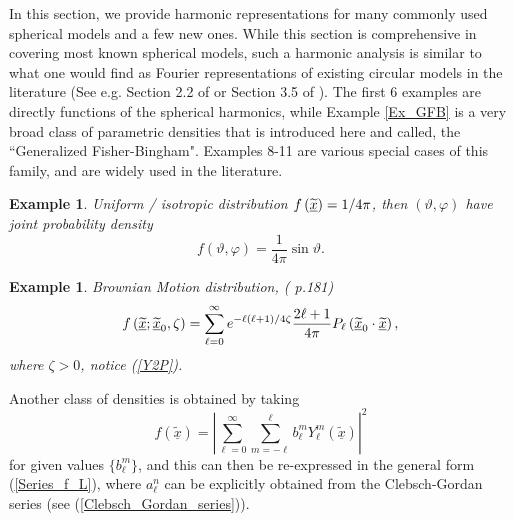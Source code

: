 \documentclass[preprint,11pt,a4paper]{elsarticle}
\newtheorem{example}[theorem]{Example}
\begin{document}
In this section, we provide harmonic representations for many commonly used
spherical models and a few new ones. While this section is comprehensive in
covering most known spherical models, such a harmonic analysis is similar to
what one would find as Fourier representations of existing circular models
in the literature (See e.g. Section 2.2 of \cite{jammalamadaka2001topics} or
Section 3.5 of \cite{mardia2009directional}). The first 6 examples are
directly functions of the spherical harmonics, while Example \ref{Ex_GFB} is
a very broad class of parametric densities that is introduced here and
called, the \textquotedblleft Generalized Fisher-Bingham". Examples 8-11 are
various special cases of this family, and are widely used in the literature. 

\begin{example}
\label{Ex_Uniform}Uniform / isotropic distribution $f\left( \underline{%
\widetilde{x}}\right) =1/4\pi$, then $\left( \vartheta ,\varphi\right) $
have joint probability density 
\begin{equation*}
f\left( \vartheta,\varphi\right) =\frac{1}{4\pi}\sin\vartheta.
\end{equation*}
\end{example}

\begin{example}
\label{Ex_BM}Brownian Motion distribution, (\cite{mardia2009directional}
p.181)%
\begin{equation}
f\left( \underline{\widetilde{x}};\underline{\widetilde{x}}_{0},\zeta\right)
=\sum_{\ell=0}^{\infty}e^{-\ell\left( \ell+1\right) /4\zeta}\frac{2\ell +1}{%
4\pi}P_{\ell}\left( \underline{\widetilde{x}}_{0}\cdot \underline{\widetilde{%
x}}\right) ,  \label{dens_BM}
\end{equation}
where $\zeta>0$, notice (\ref{Y2P}).
\end{example}

Another class of densities is obtained by taking 
\begin{equation}
f\left( \underline{\widetilde{x}}\right) =\left\vert \sum_{\ell=0}^{\infty
}\sum_{m=-\ell}^{\ell}b_{\ell}^{m}Y_{\ell}^{m}\left( \underline{\widetilde{x}%
}\right) \right\vert ^{2}  \label{densityQM_General}
\end{equation}
for given values $\{b_{\ell}^{m}\}$, and this can then be re-expressed in
the general form (\ref{Series_f_L}), where $a_{\ell}^{n}$ can be explicitly
obtained from the Clebsch-Gordan series (see (\ref{Clebsch_Gordan_series})).
\end{document}
